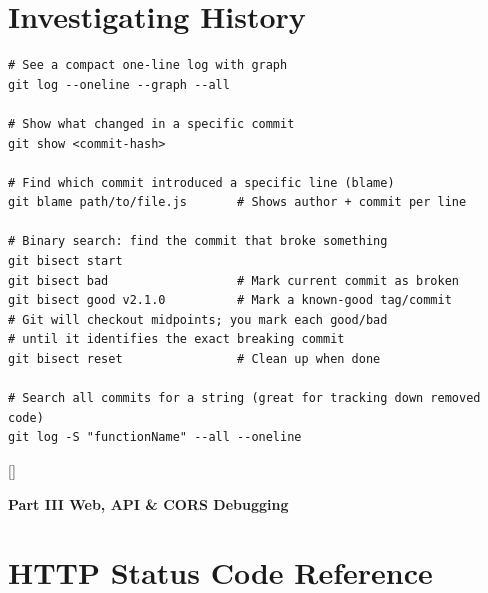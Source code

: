 \documentclass[11pt, letterpaper]{article}
\newcommand{\redsections}{%
  \titleformat{\section}{\large\bfseries\color{sectionred}}{}{0em}{}[\color{sectionred}\titlerule]%
  \titleformat{\subsection}{\normalsize\bfseries\color{sectionred!80!black}}{}{0em}{}%
}
\newcommand{\partbanner}[3]{%
  \begin{tcolorbox}[colback=#1, colframe=#2, boxrule=1.2pt, arc=4pt,
    left=8pt, right=8pt, top=6pt, bottom=6pt]
    \begin{center}{\LARGE\bfseries #3}\end{center}
  \end{tcolorbox}%
}
\begin{document}
\section*{Investigating History}

\begin{lstlisting}[style=shell, caption={Digging through history to find a bug}]
# See a compact one-line log with graph
git log --oneline --graph --all

# Show what changed in a specific commit
git show <commit-hash>

# Find which commit introduced a specific line (blame)
git blame path/to/file.js       # Shows author + commit per line

# Binary search: find the commit that broke something
git bisect start
git bisect bad                  # Mark current commit as broken
git bisect good v2.1.0          # Mark a known-good tag/commit
# Git will checkout midpoints; you mark each good/bad
# until it identifies the exact breaking commit
git bisect reset                # Clean up when done

# Search all commits for a string (great for tracking down removed code)
git log -S "functionName" --all --oneline
\end{lstlisting}

\newpage

\redsections
{}
\partbanner{part6bg}{sectionred}{Part III \quad Web, API \& CORS Debugging}

\vspace{8pt}

\section*{HTTP Status Code Reference}
\end{document}
